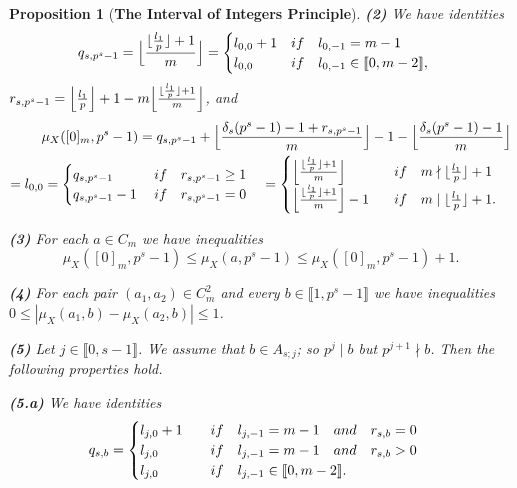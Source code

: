 \documentclass[10pt,a4paper]{amsart}
\newtheorem{proposition}{Proposition}
\def\l{\textup{l}}
\def\q{\textup{q}}
\def\r{\textup{r}}
\begin{document}
\begin{proposition}[{\bf The Interval of Integers Principle}]
{\bf (2)} We have identities 
\begin{equation*}
\q_{s,p^s-1}=\Big\lfloor\frac{\lfloor \frac{l_1}{p}\rfloor+1}{m}\Big\rfloor=\begin{cases}\l_{0,0}+1\quad\textup{if}\quad\l_{0,-1}=m-1\\
\l_{0,0}\quad\quad\;\;\,\textup{if}\quad \l_{0,-1}\in\llbracket0,m-2\rrbracket,\end{cases}
\end{equation*} 
$\r_{s,p^s-1}=\Big\lfloor \frac{l_1}{p}\Big\rfloor+1-m\Big\lfloor\frac{\lfloor \frac{l_1}{p}\rfloor+1}{m}\Big\rfloor$, and
\begin{equation}\label{EQ59}
\begin{split}\mu_X([0]_m,p^s-1)=\q_{s,p^s-1}+\Big\lfloor\frac{\delta_s(p^s-1)-1+\r_{s,p^s-1}}{m}\Big\rfloor-1-\Big\lfloor\frac{\delta_s(p^s-1)-1}{m}\Big\rfloor\\
=\l_{0,0}=\begin{cases}\q_{s,p^s-1}\quad\quad\quad\textup{if}\quad \r_{s,p^s-1}\ge 1\\
\q_{s,p^s-1}-1\quad\;\textup{if}\quad \r_{s,p^s-1}=0\end{cases}=\begin{cases}\Big\lfloor\frac{\lfloor \frac{l_1}{p}\rfloor+1}{m}\Big\rfloor\quad\quad\quad\;\;\textup{if}\quad m\nmid \lfloor \frac{l_1}{p}\rfloor+1\\
\Big\lfloor\frac{\lfloor \frac{l_1}{p}\rfloor+1}{m}\Big\rfloor-1\quad\;\;\;\textup{if}\quad m\mid\lfloor \frac{l_1}{p}\rfloor+1.\end{cases}
\end{split}
\end{equation}

{\bf (3)} For each $a\in C_m$ we have inequalities 
$$\mu_X([0]_m,p^s-1)\le\mu_X(a,p^s-1)\le \mu_X([0]_m,p^s-1)+1.$$

{\bf (4)} For each pair $(a_1,a_2)\in C_m^2$ and every $b\in\llbracket1,p^s-1\rrbracket$ we have inequalities $0\le |\mu_X(a_1,b)-\mu_X(a_2,b)|\le 1$.

\smallskip
{\bf (5)} Let $j\in\llbracket0,s-1\rrbracket$. We assume that $b\in A_{s;j}$; so $p^j\mid b$ but $p^{j+1}\nmid b$. Then the following properties hold.

\medskip\noindent
{\bf (5.a)} We have identities
$$\q_{s,b}=\begin{cases}\l_{j,0}+1\quad\quad\textup{if}\quad\l_{j,-1}=m-1\quad\textup{and}\quad \r_{s,b}=0\\
\l_{j,0}\quad\quad\quad\;\;\,\textup{if}\quad\l_{j,-1}=m-1\quad\textup{and}\quad \r_{s,b}>0\\
\l_{j,0}\quad\quad\quad\;\;\,\textup{if}\quad \l_{j,-1}\in\llbracket0,m-2\rrbracket.\end{cases}$$


\end{proposition}
\end{document}
